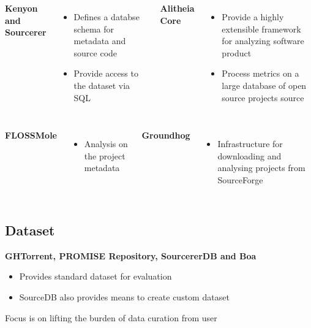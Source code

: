         \begin{frame}
            \begin{columns}
                    \textbf{Kenyon and Sourcerer}
                    \begin{itemize}
                      \item Defines a databse schema for metadata and source code
                      \item Provide access to the dataset via SQL
                    \end{itemize}

                    \textbf{Alitheia Core}
                    \begin{itemize}
                      \item Provide a highly extensible framework for analyzing software product
                      \item Process metrics on a large database of open source projects source
                    \end{itemize}
            \end{columns}
         \end{frame}

        \begin{frame}
            \begin{columns}
                    \textbf{FLOSSMole}
                    \begin{itemize}
                      \item Analysis on the project metadata
                    \end{itemize}

                    \textbf{Groundhog}
                    \begin{itemize}
                      \item Infrastructure for downloading and analysing projects from SourceForge
                    \end{itemize}
            \end{columns}
        \end{frame}


    \subsection{Dataset}
        \begin{frame}
        \textbf{GHTorrent, PROMISE Repository, SourcererDB and Boa}
           \begin{itemize}
                \item Provides standard dataset for evaluation
                \item SourceDB also provides means to create custom dataset
            \end{itemize}
            Focus is on lifting the burden of data curation from user
        \end{frame}

